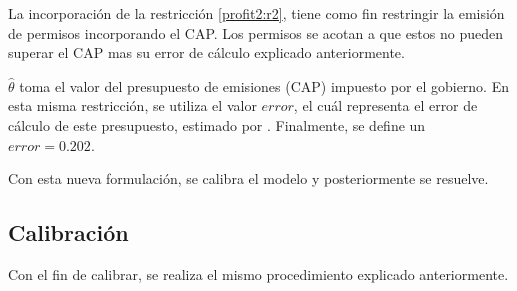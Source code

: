 La incorporación de la restricción \ref{profit2:r2}, tiene como fin restringir la emisión de permisos incorporando el CAP. Los permisos se acotan a que estos no pueden superar el CAP mas su error de cálculo explicado anteriormente.
\vspace{2.5mm}

$\hat{\theta}$ toma el valor del presupuesto de emisiones (CAP) impuesto por el gobierno. En esta misma restricción, se utiliza el valor $error$, el cuál representa el error de cálculo de este presupuesto, estimado por . Finalmente, se define un $error=0.202$. 
\vspace{2.5mm}

Con esta nueva formulación, se calibra el modelo y posteriormente se resuelve.

\subsection{Calibración}

Con el fin de calibrar, se realiza el mismo procedimiento explicado anteriormente. 

